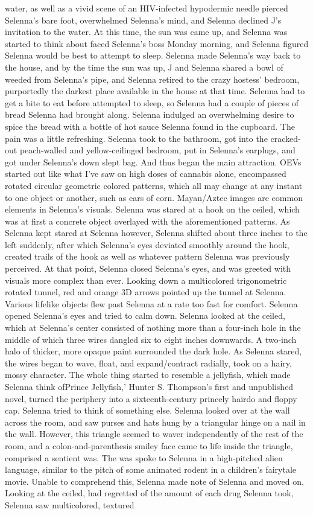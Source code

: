 \documentclass[12pt]{book}
\begin{document}
water, as well as a vivid scene of an HIV-infected hypodermic needle pierced Selenna's bare foot, overwhelmed Selenna's mind, and Selenna declined J's invitation to the water. At this time, the sun was came up, and Selenna was started to think about faced Selenna's boss Monday morning, and Selenna figured Selenna would be best to attempt to sleep. Selenna made Selenna's way back to the house, and by the time the sun was up, J and Selenna shared a bowl of weeded from Selenna's pipe, and Selenna retired to the crazy hostess' bedroom, purportedly the darkest place available in the house at that time. Selenna had to get a bite to eat before attempted to sleep, so Selenna had a couple of pieces of bread Selenna had brought along. Selenna indulged an overwhelming desire to spice the bread with a bottle of hot sauce Selenna found in the cupboard. The pain was a little refreshing. Selenna took to the bathroom, got into the cracked-out peach-walled and yellow-ceilinged bedroom, put in Selenna's earplugs, and got under Selenna's down slept bag. And thus began the main attraction. OEVs started out like what I've saw on high doses of cannabis alone, encompassed rotated circular geometric colored patterns, which all may change at any instant to one object or another, such as ears of corn. Mayan/Aztec images are common elements in Selenna's visuals. Selenna was stared at a hook on the ceiled, which was at first a concrete object overlayed with the aforementioned patterns. As Selenna kept stared at Selenna however, Selenna shifted about three inches to the left suddenly, after which Selenna's eyes deviated smoothly around the hook, created trails of the hook as well as whatever pattern Selenna was previously perceived. At that point, Selenna closed Selenna's eyes, and was greeted with visuals more complex than ever. Looking down a multicolored trigonometric rotated tunnel, red and orange 3D arrows pointed up the tunnel at Selenna. Various lifelike objects flew past Selenna at a rate too fast for comfort. Selenna opened Selenna's eyes and tried to calm down. Selenna looked at the ceiled, which at Selenna's center consisted of nothing more than a four-inch hole in the middle of which three wires dangled six to eight inches downwards. A two-inch halo of thicker, more opaque paint surrounded the dark hole. As Selenna stared, the wires began to wave, float, and expand/contract radially, took on a hairy, mossy character. The whole thing started to resemble a jellyfish, which made Selenna think ofPrince Jellyfish,' Hunter S. Thompson's first and unpublished novel, turned the periphery into a sixteenth-century princely hairdo and floppy cap. Selenna tried to think of something else. Selenna looked over at the wall across the room, and saw purses and hats hung by a triangular hinge on a nail in the wall. However, this triangle seemed to waver independently of the rest of the room, and a colon-and-parenthesis smiley face came to life inside the triangle, comprised a sentient was. The was spoke to Selenna in a high-pitched alien language, similar to the pitch of some animated rodent in a children's fairytale movie. Unable to comprehend this, Selenna made note of Selenna and moved on. Looking at the ceiled, had regretted of the amount of each drug Selenna took, Selenna saw multicolored, textured 
\end{document}
